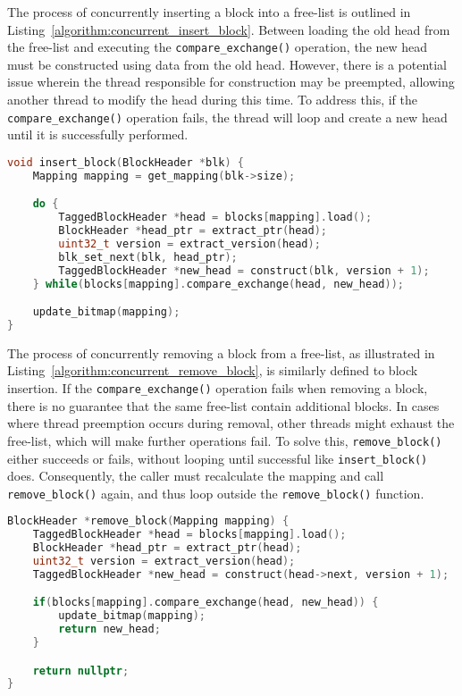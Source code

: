The process of concurrently inserting a block into a free-list is outlined in Listing~\ref{algorithm:concurrent_insert_block}. Between loading the old head from the free-list and executing the \texttt{compare\_exchange()} operation, the new head must be constructed using data from the old head. However, there is a potential issue wherein the thread responsible for construction may be preempted, allowing another thread to modify the head during this time. To address this, if the \texttt{compare\_exchange()} operation fails, the thread will loop and create a new head until it is successfully performed.

\begin{lstlisting}[language=C++, caption={Concurrent insertion of a lock into the head of a free-list.}, label={algorithm:concurrent_insert_block}]
void insert_block(BlockHeader *blk) {
    Mapping mapping = get_mapping(blk->size);

    do {
        TaggedBlockHeader *head = blocks[mapping].load();
        BlockHeader *head_ptr = extract_ptr(head);
        uint32_t version = extract_version(head);
        blk_set_next(blk, head_ptr);
        TaggedBlockHeader *new_head = construct(blk, version + 1);
    } while(blocks[mapping].compare_exchange(head, new_head));

    update_bitmap(mapping);
}
\end{lstlisting}

The process of concurrently removing a block from a free-list, as illustrated in Listing~\ref{algorithm:concurrent_remove_block}, is similarly defined to block insertion. If the \texttt{compare\_exchange()} operation fails when removing a block, there is no guarantee that the same free-list contain additional blocks. In cases where thread preemption occurs during removal, other threads might exhaust the free-list, which will make further operations fail. To solve this, \texttt{remove\_block()} either succeeds or fails, without looping until successful like \texttt{insert\_block()} does. Consequently, the caller must recalculate the mapping and call \texttt{remove\_block()} again, and thus loop outside the \texttt{remove\_block()} function.

\begin{lstlisting}[language=C++, caption={Concurrent removal of the head of a free-list.}, label={algorithm:concurrent_remove_block}]
BlockHeader *remove_block(Mapping mapping) {
    TaggedBlockHeader *head = blocks[mapping].load();
    BlockHeader *head_ptr = extract_ptr(head);
    uint32_t version = extract_version(head);
    TaggedBlockHeader *new_head = construct(head->next, version + 1);

    if(blocks[mapping].compare_exchange(head, new_head)) {
        update_bitmap(mapping);
        return new_head;
    }

    return nullptr;
}
\end{lstlisting}


